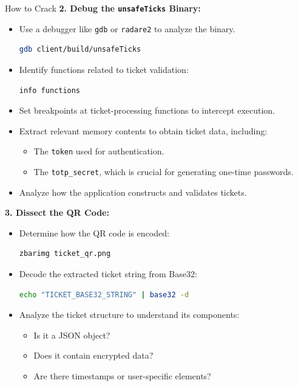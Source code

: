 \documentclass[final,dvipsnames]{beamer}
\newlength{\colwidth}
\begin{document}
\begin{frame}[t, fragile]
\begin{columns}[t]
\begin{column}{\colwidth}
\begin{block}{How to Crack}
        \textbf{2. Debug the \texttt{unsafeTicks} Binary:}
        \begin{itemize}
            \item Use a debugger like \texttt{gdb} or \texttt{radare2} to analyze the binary.
            \begin{lstlisting}[language=bash]
            gdb client/build/unsafeTicks
            \end{lstlisting}
            \item Identify functions related to ticket validation:
            \begin{lstlisting}[language=bash]
            info functions
            \end{lstlisting}
            \item Set breakpoints at ticket-processing functions to intercept execution.
            \item Extract relevant memory contents to obtain ticket data, including:
            \begin{itemize}
                \item The \texttt{token} used for authentication.
                \item The \texttt{totp\_secret}, which is crucial for generating one-time passwords.
            \end{itemize}
            \item Analyze how the application constructs and validates tickets.
        \end{itemize}

        \textbf{3. Dissect the QR Code:}
        \begin{itemize}
            \item Determine how the QR code is encoded:
            \begin{lstlisting}[language=bash]
            zbarimg ticket_qr.png
            \end{lstlisting}
            \item Decode the extracted ticket string from Base32:
            \begin{lstlisting}[language=bash]
            echo "TICKET_BASE32_STRING" | base32 -d
            \end{lstlisting}
            \item Analyze the ticket structure to understand its components:
            \begin{itemize}
                \item Is it a JSON object?
                \item Does it contain encrypted data?
                \item Are there timestamps or user-specific elements?
            \end{itemize}
        \end{itemize}


\end{block}
\end{column}
\end{columns}
\end{frame}
\end{document}
